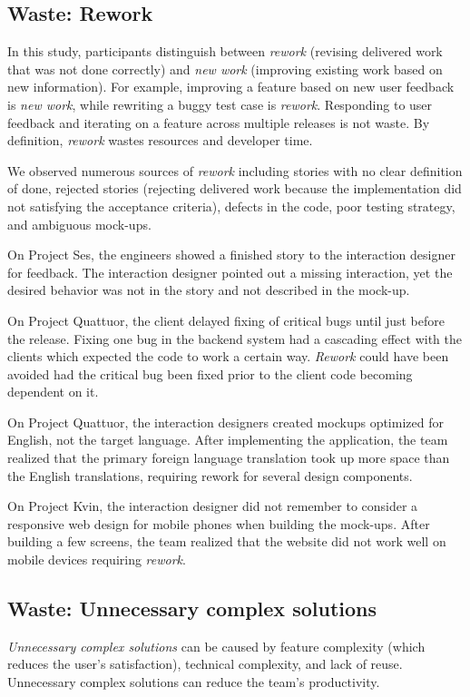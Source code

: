 \subsection{Waste: Rework}
In this study, participants distinguish between \textit{rework} (revising delivered work that was not done correctly) and \textit{new work} (improving existing work based on new information). For example, improving a feature based on new user feedback is \textit{new work}, while rewriting a buggy test case is \textit{rework}. Responding to user feedback and iterating on a feature across multiple releases is not waste. By definition, \textit{rework} wastes resources and developer time. 

We observed numerous sources of \textit{rework} including stories with no clear definition of done, rejected stories (rejecting delivered work because the implementation did not satisfying the  acceptance criteria), defects in the code, poor testing strategy, and ambiguous mock-ups.

On Project Ses, the engineers showed a finished story to the interaction designer for feedback. The interaction designer pointed out a missing interaction, yet the desired behavior was not in the story and not described in the mock-up.

On Project Quattuor, the client delayed fixing of critical bugs until just before the release. Fixing one bug in the backend system had a cascading effect with the clients which expected the code to work a certain way. \textit{Rework} could have been avoided had the critical bug been fixed prior to the client code becoming dependent on it.

On Project Quattuor, the interaction designers created mockups optimized for English, not the target language. After implementing the application, the team realized that the primary foreign language translation took up more space than the English translations, requiring rework for several design components. 

On Project Kvin, the interaction designer did not remember to consider a responsive web design for mobile phones when building the mock-ups. After building a few screens, the team realized that the website did not work well on mobile devices requiring \textit{rework}.
\subsection{Waste: Unnecessary complex solutions}
\textit{Unnecessary complex solutions} can be caused by feature complexity (which reduces the user's satisfaction), technical complexity, and lack of reuse. Unnecessary complex solutions can reduce the team's productivity. 

